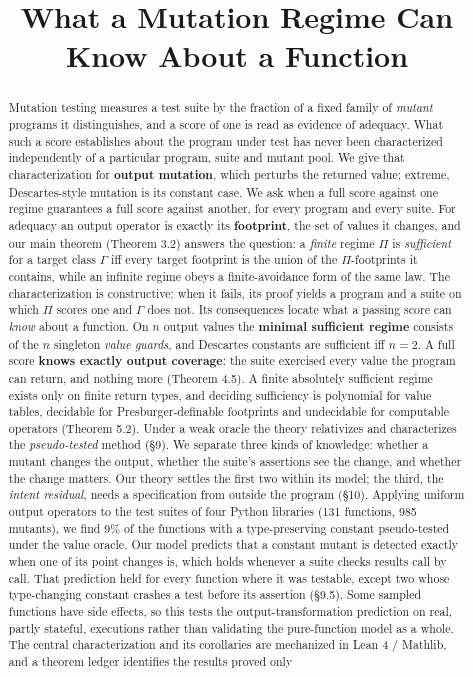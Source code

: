\documentclass[conference]{IEEEtran}
\theoremstyle{run}
\begin{document}
\title{What a Mutation Regime Can Know About a Function}
\author{}
\maketitle
\begin{abstract}
Mutation testing measures a test suite by the fraction of a fixed family of \emph{mutant} programs it distinguishes, and a score of one is read as evidence of adequacy. What such a score establishes about the program under test has never been characterized independently of a particular program, suite and mutant pool. We give that characterization for \textbf{output mutation}, which perturbs the returned value; extreme, Descartes-style mutation is its constant case. We ask when a full score against one regime guarantees a full score against another, for every program and every suite. For adequacy an output operator is exactly its \textbf{footprint}, the set of values it changes, and our main theorem (Theorem 3.2) answers the question: a \emph{finite} regime $\Pi$ is \emph{sufficient} for a target class $\Gamma$ iff every target footprint is the union of the $\Pi$-footprints it contains, while an infinite regime obeys a finite-avoidance form of the same law. The characterization is constructive: when it fails, its proof yields a program and a suite on which $\Pi$ scores one and $\Gamma$ does not. Its consequences locate what a passing score can \emph{know} about a function. On $n$ output values the \textbf{minimal sufficient regime} consists of the $n$ singleton \emph{value guards}, and Descartes constants are sufficient iff $n = 2$. A full score \textbf{knows exactly output coverage}: the suite exercised every value the program can return, and nothing more (Theorem 4.5). A finite absolutely sufficient regime exists only on finite return types, and deciding sufficiency is polynomial for value tables, decidable for Presburger-definable footprints and undecidable for computable operators (Theorem 5.2). Under a weak oracle the theory relativizes and characterizes the \emph{pseudo-tested} method (\S 9). We separate three kinds of knowledge: whether a mutant changes the output, whether the suite's assertions see the change, and whether the change matters. Our theory settles the first two within its model; the third, the \emph{intent residual}, needs a specification from outside the program (\S 10). Applying uniform output operators to the test suites of four Python libraries (131 functions, 985 mutants), we find 9\% of the functions with a type-preserving constant pseudo-tested under the value oracle. Our model predicts that a constant mutant is detected exactly when one of its point changes is, which holds whenever a suite checks results call by call. That prediction held for every function where it was testable, except two whose type-changing constant crashes a test before its assertion (\S 9.5). Some sampled functions have side effects, so this tests the output-transformation prediction on real, partly stateful, executions rather than validating the pure-function model as a whole. The central characterization and its corollaries are mechanized in Lean 4 / Mathlib, and a theorem ledger identifies the results proved only 
\end{abstract}
\end{document}
